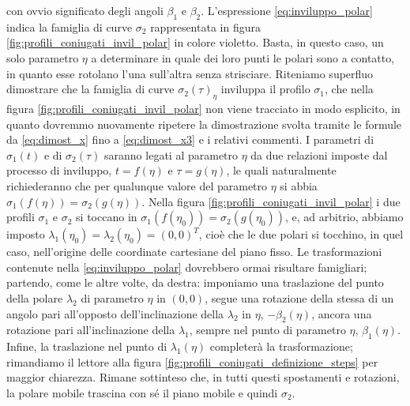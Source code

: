 \noindent con ovvio significato degli angoli $\beta_1$ e $\beta_2$.
L'espressione \ref{eq:inviluppo_polar} indica la famiglia di 
curve $\sigma_2$ rappresentata in figura \ref{fig:profili_coniugati_invil_polar}
in colore violetto.
Basta, in questo caso, un solo parametro $\eta$ a determinare in quale
dei loro punti le polari sono a contatto, in quanto
esse rotolano l'una sull'altra senza strisciare.
Riteniamo superfluo dimostrare che la famiglia di curve 
${\sigma_2(\tau)}_\eta$ inviluppa il profilo $\sigma_1$, che nella figura
\ref{fig:profili_coniugati_invil_polar} non viene tracciato in modo esplicito,
 in quanto dovremmo nuovamente
ripetere la dimostrazione svolta tramite le formule da \ref{eq:dimost_x} fino a
\ref{eq:dimost_x3} e i relativi commenti.
I parametri di $\sigma_1(t)$ e di $\sigma_2(\tau)$ saranno legati al parametro
$\eta$ da due relazioni imposte dal processo di inviluppo, $t=f(\eta)$ e
$\tau=g(\eta)$, le quali naturalmente richiederanno che per qualunque
valore del parametro $\eta$ si abbia $\sigma_1(f(\eta))=\sigma_2(g(\eta))$.
Nella figura \ref{fig:profili_coniugati_invil_polar} i due profili $\sigma_1$ e $\sigma_2$
si toccano in $\sigma_1(f(\eta_0))=\sigma_2(g(\eta_0))$, e, ad arbitrio,
abbiamo imposto $\lambda_1(\eta_0)=\lambda_2(\eta_0)=(0,0)^T$, cio\`e che 
le due polari si tocchino, in quel caso,
nell'origine delle coordinate cartesiane del piano fisso.
Le trasformazioni contenute nella \ref{eq:inviluppo_polar} dovrebbero
ormai risultare
famigliari; partendo, come le altre volte,  da destra: 
imponiamo una traslazione del punto della polare $\lambda_2$
di parametro $\eta$ in $(0,0)$, segue una rotazione della stessa di un
angolo pari all'opposto dell'inclinazione della $\lambda_2$ in $\eta$,
$-\beta_2(\eta)$, ancora una rotazione pari all'inclinazione
della $\lambda_1$, sempre nel punto di
parametro $\eta$, $\beta_1(\eta)$. Infine, la traslazione 
nel punto di $\lambda_1(\eta)$ completer\`a la trasformazione;
rimandiamo il lettore alla figura
\ref{fig:profili_coniugati_definizione_steps} per maggior chiarezza.
Rimane sottinteso che, in tutti questi spostamenti e rotazioni, la polare
mobile trascina con s\'e il piano mobile e quindi $\sigma_2$.
